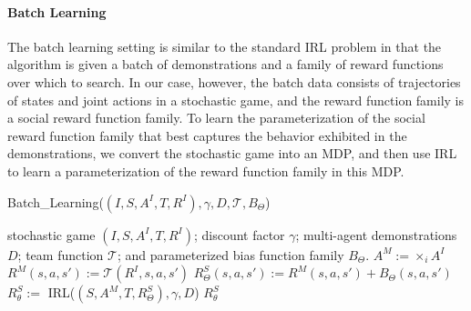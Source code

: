 
\vspace{\up}
\paragraph{Batch Learning}
\label{sec:batch}

The batch learning setting is similar to the standard IRL problem in
that the algorithm is given a batch of demonstrations and a family of
reward functions over which to search. In our case, however, the batch
data consists of trajectories of states and joint actions in a
stochastic game, and the reward function family is a social reward
function family.  To learn the parameterization of the social reward
function family that best captures the behavior exhibited in the
demonstrations, we convert the stochastic game into an MDP,
and then use IRL to learn a parameterization of the reward function
family in this MDP.

\begin{algorithm}[t]
\caption{Batch\_Learning($(I,S,A^I,T,R^I), \gamma, D, {\mathcal T}, B_\Theta$)}
\label{alg:srl}
\begin{algorithmic}
\Require stochastic game $(I,S,A^I,T,R^I)$; discount factor $\gamma$; multi-agent demonstrations $D$; team function ${\mathcal T}$; and parameterized bias function family $B_\Theta$.
\State $A^M := \times_i A^I$ 
\State $R^M(s, a, s') := {\mathcal T}(R^I, s, a, s')$ 
\State $R^S_\Theta(s, a, s') := R^M(s, a, s') + B_\Theta(s, a, s')$ 
\State $R^S_\theta :=$ IRL($(S,A^M,T,R^S_\Theta), \gamma, D$)
\State \Return $R^S_\theta$ 
\end{algorithmic}
\end{algorithm}

